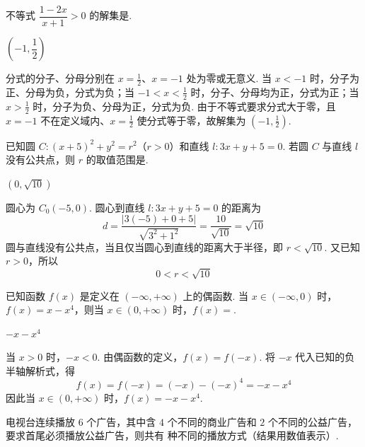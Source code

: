 \begin{problem}
不等式 \(\dfrac{1-2x}{x+1}>0\) 的解集是\fillinblank{}.
\end{problem}

\begin{answer}
\(\left(-1,\dfrac12\right)\)
\end{answer}

\begin{solution}
分式的分子、分母分别在 \(x=\frac12\)、\(x=-1\) 处为零或无意义. 当 \(x<-1\) 时，分子为正、分母为负，分式为负；当 \(-1<x<\frac12\) 时，分子、分母均为正，分式为正；当 \(x>\frac12\) 时，分子为负、分母为正，分式为负.
由于不等式要求分式大于零，且 \(x=-1\) 不在定义域内、\(x=\frac12\) 使分式等于零，故解集为 \(\left(-1,\frac12\right)\).
\end{solution}

\begin{problem}
已知圆 \(C:(x+5)^2+y^2=r^2\)（\(r>0\)）和直线 \(l:3x+y+5=0\). 若圆 \(C\) 与直线 \(l\) 没有公共点，则 \(r\) 的取值范围是\fillinblank{}.
\end{problem}

\begin{answer}
\((0,\sqrt{10})\)
\end{answer}

\begin{solution}
圆心为 \(C_0(-5,0)\). 圆心到直线 \(l:3x+y+5=0\) 的距离为
\[
d=\frac{|3(-5)+0+5|}{\sqrt{3^2+1^2}}=\frac{10}{\sqrt{10}}=\sqrt{10}
\]
圆与直线没有公共点，当且仅当圆心到直线的距离大于半径，即 \(r<\sqrt{10}\). 又已知 \(r>0\)，所以
\[
0<r<\sqrt{10}
\]
\end{solution}

\begin{problem}
已知函数 \(f(x)\) 是定义在 \((-\infty,+\infty)\) 上的偶函数. 当 \(x\in(-\infty,0)\) 时，\(f(x)=x-x^4\)，则当 \(x\in(0,+\infty)\) 时，\(f(x)=\)\fillinblank{}.
\end{problem}

\begin{answer}
\(-x-x^4\)
\end{answer}

\begin{solution}
当 \(x>0\) 时，\(-x<0\). 由偶函数的定义，\(f(x)=f(-x)\). 将 \(-x\) 代入已知的负半轴解析式，得
\[
f(x)=f(-x)=(-x)-(-x)^4=-x-x^4
\]
因此当 \(x\in(0,+\infty)\) 时，\(f(x)=-x-x^4\).
\end{solution}

\begin{problem}
电视台连续播放 \(6\) 个广告，其中含 \(4\) 个不同的商业广告和 \(2\) 个不同的公益广告，要求首尾必须播放公益广告，则共有\fillinblank{} 种不同的播放方式（结果用数值表示）.
\end{problem}

